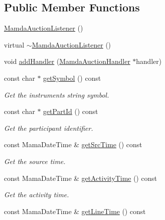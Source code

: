 \subsection*{Public Member Functions}
\begin{CompactItemize}
\item 
\hyperlink{classWombat_1_1MamdaAuctionListener_97294885eb3fd7da2a1db6bee9c7c781}{Mamda\-Auction\-Listener} ()
\item 
virtual \hyperlink{classWombat_1_1MamdaAuctionListener_fb100d7de6c0bf043d28922f7c425e6f}{$\sim$Mamda\-Auction\-Listener} ()
\item 
void \hyperlink{classWombat_1_1MamdaAuctionListener_5f36422751a3c573fa70fd6e025dfc35}{add\-Handler} (\hyperlink{classWombat_1_1MamdaAuctionHandler}{Mamda\-Auction\-Handler} $\ast$handler)
\item 
const char $\ast$ \hyperlink{classWombat_1_1MamdaAuctionListener_3da43832419d2b77a848b7261b3c3d34}{get\-Symbol} () const 
\begin{CompactList}\small\item\em Get the instruments string symbol. \item\end{CompactList}\item 
const char $\ast$ \hyperlink{classWombat_1_1MamdaAuctionListener_e009ff1afdcd5b44383b46177749feac}{get\-Part\-Id} () const 
\begin{CompactList}\small\item\em Get the participant identifier. \item\end{CompactList}\item 
const Mama\-Date\-Time \& \hyperlink{classWombat_1_1MamdaAuctionListener_4632a4659cd012dee4d8059ee7fab6c7}{get\-Src\-Time} () const 
\begin{CompactList}\small\item\em Get the source time. \item\end{CompactList}\item 
const Mama\-Date\-Time \& \hyperlink{classWombat_1_1MamdaAuctionListener_1e1e7f267e1681fe0edddd1a9748bc9e}{get\-Activity\-Time} () const 
\begin{CompactList}\small\item\em Get the activity time. \item\end{CompactList}\item 
const Mama\-Date\-Time \& \hyperlink{classWombat_1_1MamdaAuctionListener_e9c0fa0d65584e373f0e645566428a8e}{get\-Line\-Time} () const 

\end{CompactItemize}
